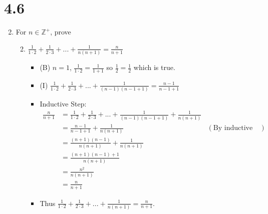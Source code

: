 \documentclass[12pt]{article}
\newcommand{\Z}{\mathbb{Z}}
\begin{document}
\section*{4.6}
\begin{enumerate}

\setcounter{enumi}{1}
\item For $n\in\Z^+$, prove
	\begin{enumerate}
	\setcounter{enumii}{1}
	\item $\frac{1}{1\cdot2} + \frac{1}{2\cdot3}+ ... + \frac{1}{n(n+1)} = \frac{n}{n+1}$\\
		\begin{itemize}
		\item (B) $n=1$,  $\frac{1}{1\cdot2} = \frac{1}{1+1}$ so $\frac{1}{2}=\frac{1}{2}$ which is true.
		\item (I) $\frac{1}{1\cdot2} + \frac{1}{2\cdot3}+ ... + \frac{1}{(n-1)(n-1+1)} = \frac{n-1}{n-1+1}$\\
		\item Inductive Step:
			\begin{align*}
			\frac{n}{n+1} &= 
			\frac{1}{1\cdot2} + \frac{1}{2\cdot3}+ ... + \frac{1}{(n-1)(n-1+1)} + \frac{1}{n(n+1)}\\
			&= \frac{n-1}{n-1+1} + \frac{1}{n(n+1)} & (\text{By inductive hypothesis})\\
			&= \frac{(n+1)(n-1)}{n(n+1)} + \frac{1}{n(n+1)} \\
			&= \frac{(n+1)(n-1)+1}{n(n+1)}\\
			&= \frac{n^2}{n(n+1)}\\
			&= \frac{n}{n+1}
			\end{align*}
		\item Thus $\frac{1}{1\cdot2} + \frac{1}{2\cdot3}+ ... + \frac{1}{n(n+1)} = \frac{n}{n+1}$.
		\end{itemize}
	\end{enumerate}


\end{enumerate}
\end{document}
